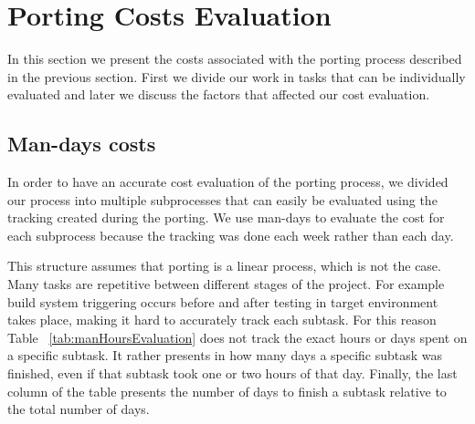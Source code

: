 \section{Porting Costs Evaluation} \label{sec:eval}

%
%
%

In this section we present the costs associated with the porting process
described in the previous section. First we divide our work in tasks that can
be individually evaluated and later we discuss the factors that affected our
cost evaluation.

\subsection{Man-days costs}

In order to have an accurate cost evaluation of the porting process, we divided
our process into multiple subprocesses that can easily be evaluated using the
tracking created during the porting. We use man-days to evaluate the
cost for each subprocess because the tracking was done each week rather than
each day.

This structure assumes that porting is a linear process, which is not the case.
Many tasks are repetitive between different stages of the project. For example
build system triggering occurs before and after testing in target environment takes place,
making it hard to accurately track each subtask. For this reason Table
~\ref{tab:manHoursEvaluation} does not track the exact hours or days spent
on a specific subtask. It rather presents in how many days a specific subtask
was finished, even if that subtask took one or two hours of that day. Finally,
the last column of the table presents the number of days to finish a subtask
relative to the total number of days.

